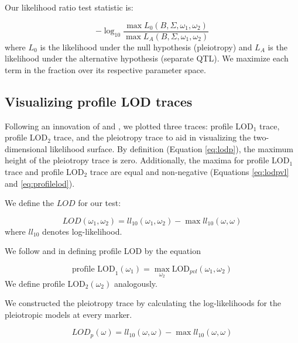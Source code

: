 \documentclass[12pt,twoside, lineno]{gsajnl}
\begin{document}
\noindent Our likelihood ratio test statistic is:

\begin{equation}
- \log_{10} \frac{\max L_0(B, \Sigma, \omega_1, \omega_2)}{\max L_A(B, \Sigma, \omega_1, \omega_2)}
\label{eqn:test-statistic}
\end{equation}
where $L_0$ is the likelihood under the null hypothesis (pleiotropy) and $L_A$ is the likelihood under the alternative hypothesis (separate QTL). We maximize each term in the fraction over its respective parameter space. 

\subsection{Visualizing profile LOD traces}     

Following an innovation of \citet{zeng2000genetic} and \citet{tian2016dissection}, we plotted three traces: profile LOD$_1$ trace, profile LOD$_2$ trace, and the pleiotropy trace to aid in visualizing the two-dimensional likelihood surface. By definition (Equation \ref{eq:lodp}), the maximum height of the pleiotropy trace is zero. Additionally, the maxima for profile LOD$_1$ trace and profile LOD$_2$ trace are equal and non-negative (Equations \ref{eq:lodpvl} and \ref{eq:profilelod}).

We define the $LOD$ for our test:

\begin{equation}
LOD(\omega_1, \omega_2) = ll_{10}(\omega_1, \omega_2) - \max ll_{10}(\omega, \omega)
\label{eq:lodpvl}
\end{equation}
where $ll_{10}$ denotes log-likelihood.

We follow \citet{zeng2000genetic} and \citet{tian2016dissection} in defining profile LOD by the equation

\begin{equation}
\text{profile LOD}_1(\omega_1) = \max_{\omega_2}\text{LOD}_{pvl}(\omega_1, \omega_2) 
\label{eq:profilelod}
\end{equation}
We define profile LOD$_2(\omega_2)$ analogously. 

We constructed the pleiotropy trace by calculating the log-likelihoods for the pleiotropic models at every marker.

\begin{equation}
LOD_{p}(\omega) = ll_{10}(\omega, \omega) - \max ll_{10}(\omega, \omega)
\label{eq:lodp}
\end{equation}
\end{document}

